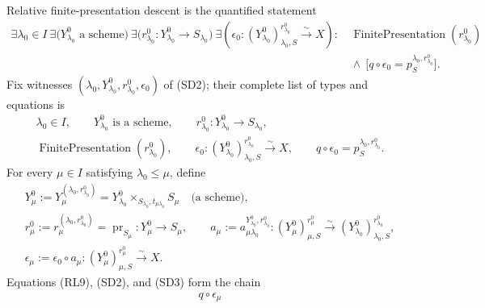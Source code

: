 \begin{definition}
  Relative finite-presentation descent
  \cite[\href{https://stacks.math.columbia.edu/tag/01ZM}{Tag 01ZM}]
       {stacks-project} is the quantified statement
  \[
  \begin{split}
    \exists\lambda_0\in I\ \exists
      \bigl(Y_{\lambda_0}^0\text{ a scheme}\bigr)\ \exists
      \bigl(r_{\lambda_0}^0\colon
        Y_{\lambda_0}^0\to S_{\lambda_0}\bigr)\ \exists
      \left(
        \epsilon_0\colon
          (Y_{\lambda_0}^0)_{\lambda_0,S}^{r_{\lambda_0}^0}
            \xrightarrow{\sim}X
      \right):\quad&
      \operatorname{FinitePresentation}(r_{\lambda_0}^0)\\
      &{}\wedge\
      \bigl[
        q\circ\epsilon_0
          =p_S^{\lambda_0,r_{\lambda_0}^0}
      \bigr].
  \end{split}                                                       \tag{SD2}
  \]
  Fix witnesses \((\lambda_0,Y_{\lambda_0}^0,
  r_{\lambda_0}^0,\epsilon_0)\) of (SD2); their complete list of types and
  equations is
  \[
  \begin{gathered}
    \lambda_0\in I,\qquad
    Y_{\lambda_0}^0\text{ is a scheme},\qquad
    r_{\lambda_0}^0\colon Y_{\lambda_0}^0\to S_{\lambda_0},\\
    \operatorname{FinitePresentation}(r_{\lambda_0}^0),\qquad
    \epsilon_0\colon
      (Y_{\lambda_0}^0)_{\lambda_0,S}^{r_{\lambda_0}^0}
        \xrightarrow{\sim}X,\qquad
    q\circ\epsilon_0=p_S^{\lambda_0,r_{\lambda_0}^0}.
  \end{gathered}
  \]
  For every \(\mu\in I\) satisfying \(\lambda_0\leq\mu\), define
  \[
  \begin{gathered}
    Y_\mu^0
      :=Y_\mu^{(\lambda_0,r_{\lambda_0}^0)}
      =Y_{\lambda_0}^0
          \times_{S_{\lambda_0},t_{\mu\lambda_0}}S_\mu
      \quad\text{(a scheme)},\\
    r_\mu^0
      :=r_\mu^{(\lambda_0,r_{\lambda_0}^0)}
      =\operatorname{pr}_{S_\mu}\colon Y_\mu^0\to S_\mu,\qquad
    a_\mu
      :=a_{\mu\lambda_0}^{Y_{\lambda_0}^0,r_{\lambda_0}^0}
      \colon (Y_\mu^0)_{\mu,S}^{r_\mu^0}
        \xrightarrow{\sim}
        (Y_{\lambda_0}^0)_{\lambda_0,S}^{r_{\lambda_0}^0},\\
    \epsilon_\mu:=\epsilon_0\circ a_\mu
      \colon (Y_\mu^0)_{\mu,S}^{r_\mu^0}\xrightarrow{\sim}X.
  \end{gathered}                                                    \tag{SD3}
  \]
  Equations (RL9), (SD2), and (SD3) form the chain
  \[
  \begin{aligned}
    q\circ\epsilon_\mu

\end{aligned}\]
\end{definition}

